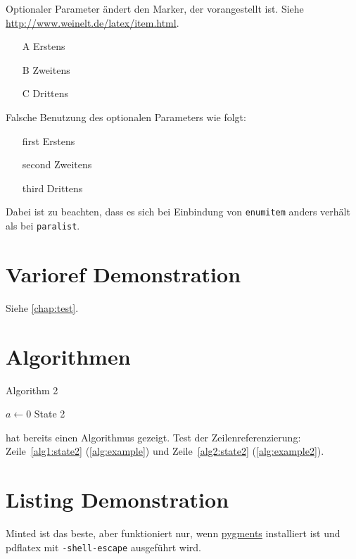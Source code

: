 Optionaler Parameter ändert den Marker, der vorangestellt ist. Siehe \url{http://www.weinelt.de/latex/item.html}.
\begin{itemize}
\item[A] Erstens
\item[B] Zweitens
\item[C] Drittens
\end{itemize}

Falsche Benutzung des optionalen Parameters wie folgt:
\begin{itemize}
\item[first] Erstens
\item[second] Zweitens
\item[third] Drittens
\end{itemize}
Dabei ist zu beachten, dass es sich bei Einbindung von \texttt{enumitem} anders verhält als bei \texttt{paralist}.


\section{Varioref Demonstration}
Siehe \vref{chap:test}.

\section{Algorithmen}
\begin{algorithm}

\caption{Algorithm 2}
\label{alg:example2}
\begin{algorithmic}[1]
\State $a \gets 0$
\State State 2\label{alg2:state2}
\end{algorithmic}
\end{algorithm}

 hat bereits einen Algorithmus gezeigt.
Test der Zeilenreferenzierung: Zeile~\ref{alg1:state2} (\cref{alg:example}) und Zeile~\ref{alg2:state2} (\cref{alg:example2}).

\section{Listing Demonstration}
Minted ist das beste, aber funktioniert nur, wenn \href{http://pygments.org/download/}{pygments} installiert ist und pdflatex mit \texttt{-shell-escape} ausgeführt wird.

\iffalse
\begin{listing}
\begin{verbatim}
<process name="reisebuero">
</process>
\end{verbatim}
\caption{Beispielprozess}
\label{lst:beispielprozess}
\end{listing}
\fi

